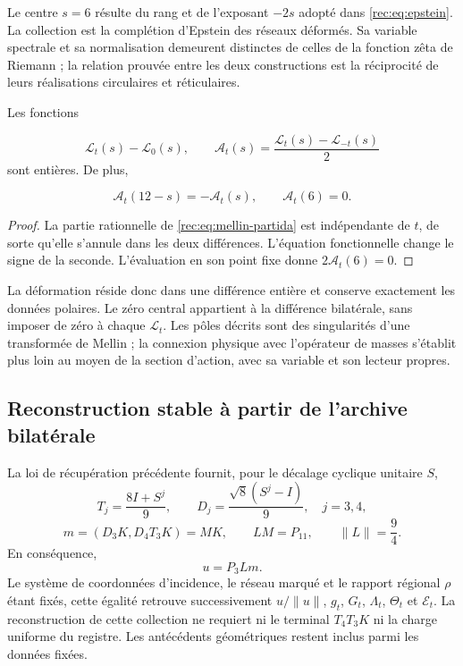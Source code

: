 Le centre \(s=6\) résulte du rang et de l’exposant \(-2s\) adopté dans \eqref{rec:eq:epstein}. La collection est la complétion d’Epstein des réseaux déformés. Sa variable spectrale et sa normalisation demeurent distinctes de celles de la fonction zêta de Riemann ; la relation prouvée entre les deux constructions est la réciprocité de leurs réalisations circulaires et réticulaires.

\begin{corollary}
\label{rec:cor:polar}
Les fonctions

\[
 \mathcal L_t(s)-\mathcal L_0(s),\qquad
 \mathcal A_t(s)=\frac{\mathcal L_t(s)-\mathcal L_{-t}(s)}2
\]
sont entières. De plus,

\[
 \mathcal A_t(12-s)=-\mathcal A_t(s),\qquad \mathcal A_t(6)=0.
\]
\end{corollary}
\begin{proof}
La partie rationnelle de \eqref{rec:eq:mellin-partida} est indépendante de \(t\), de sorte qu’elle s’annule dans les deux différences. L’équation fonctionnelle change le signe de la seconde. L’évaluation en son point fixe donne \(2\mathcal A_t(6)=0\).

\end{proof}

La déformation réside donc dans une différence entière et conserve exactement les données polaires. Le zéro central appartient à la différence bilatérale, sans imposer de zéro à chaque \(\mathcal L_t\). Les pôles décrits sont des singularités d’une transformée de Mellin ; la connexion physique avec l’opérateur de masses s’établit plus loin au moyen de la section d’action, avec sa variable et son lecteur propres.


\subsection{Reconstruction stable à partir de l’archive bilatérale}
\label{rec:archivo}

La loi de récupération précédente fournit, pour le décalage cyclique unitaire \(S\),
\[
 T_j=\frac{8I+S^j}{9},\qquad D_j=\frac{\sqrt8(S^j-I)}9,
 \quad j=3,4,
\]
\begin{equation}
 m=(D_3K,D_4T_3K)=MK,\qquad LM=P_{11},\qquad\|L\|=\frac94.
 \label{rec:eq:archivo}
\end{equation}
En conséquence,
\begin{equation}
 u=P_3Lm.
 \label{rec:eq:recuperacion-u}
\end{equation}
Le système de coordonnées d’incidence, le réseau marqué et le rapport régional \(\rho\) étant fixés, cette égalité retrouve successivement \(u/\|u\|\), \(g_t\), \(G_t\), \(\Lambda_t\), \(\Theta_t\) et \(\mathcal E_t\). La reconstruction de cette collection ne requiert ni le terminal \(T_4T_3K\) ni la charge uniforme du registre. Les antécédents géométriques restent inclus parmi les données fixées.

